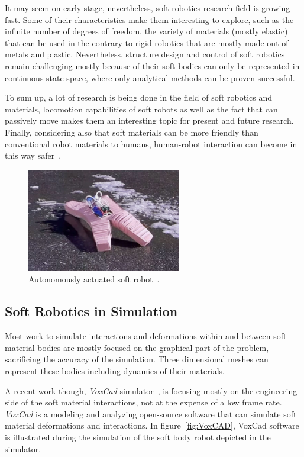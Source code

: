 It may seem on early stage, nevertheless, soft robotics research field is growing fast. Some of their characteristics make them interesting to explore, such as the infinite number of degrees of freedom, the variety of materials (mostly elastic) that can be used in the contrary to rigid robotics that are mostly made out of metals and plastic. Nevertheless, structure design and control of soft robotics remain challenging mostly because of their soft bodies can only be represented in continuous state space, where only analytical methods can be proven successful.

To sum up, a lot of research is being done in the field of soft robotics and materials, locomotion capabilities of soft robots as well as the fact that can passively move makes them an interesting topic for present and future research. Finally, considering also that soft materials can be more friendly than conventional robot materials to humans, human-robot interaction can become in this way safer~\cite{sanan2011continuum}.


\begin{figure}
\centering
\includegraphics[width=0.6\textwidth]{../Figures/Misc/softbot.jpg}
\caption{Autonomously actuated soft robot~\cite{tolleyresilient}.}
\label{fig:softbot}
\end{figure}


\subsection{Soft Robotics in Simulation}

Most work to simulate interactions and deformations within and between soft material bodies are mostly focused on the graphical part of the problem, sacrificing the accuracy of the simulation. Three dimensional meshes can represent these bodies including dynamics of their materials. 

A recent work though, \emph{VoxCad} simulator~\cite{hiller2012dynamic}, is focusing mostly on the engineering side of the soft material interactions, not at the expense of a low frame rate. \emph{VoxCad} is a modeling and analyzing open-source software that can simulate soft material deformations and interactions. In figure~\ref{fig:VoxCAD}, VoxCad software is illustrated during the simulation of the soft body robot depicted in the simulator.


